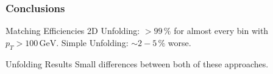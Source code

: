 \documentclass[compress]{beamer}
\begin{document}

\begin{frame}
\frametitle{Conclusions}
\begin{block}{Matching Efficiencies}
  2D Unfolding: $> 99\,\%$ for almost every bin with $p_T>100\,\text{GeV}$.
  Simple Unfolding: $\sim 2-5\,\%$ worse.
\end{block}
\begin{block}{Unfolding Results}
  Small differences between both of these approaches.
\end{block}
\end{frame}


%
%
%
%
%
\end{document}
